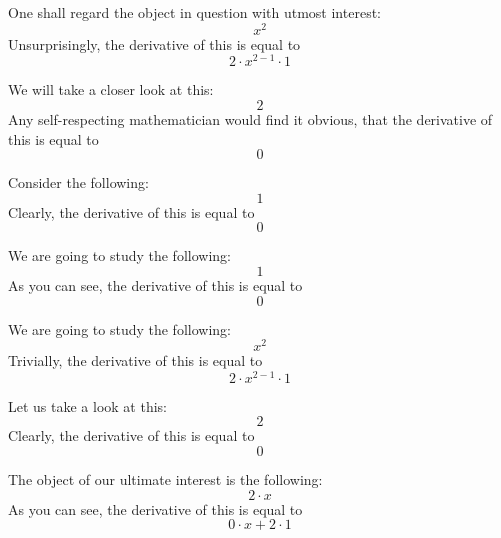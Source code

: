 \documentclass{article}
\begin{document}
One shall regard the object in question with utmost interest:
\begin{equation}
x ^{2 } 
\end{equation}
Unsurprisingly, the derivative of this is equal to
\begin{equation}
2 \cdot x ^{2 - 1 } \cdot 1 
\end{equation}

We will take a closer look at this:
\begin{equation}
2 
\end{equation}
Any self-respecting mathematician would find it obvious, that the derivative of this is equal to
\begin{equation}
0 
\end{equation}

Consider the following:
\begin{equation}
1 
\end{equation}
Clearly, the derivative of this is equal to
\begin{equation}
0 
\end{equation}

We are going to study the following:
\begin{equation}
1 
\end{equation}
As you can see, the derivative of this is equal to
\begin{equation}
0 
\end{equation}

We are going to study the following:
\begin{equation}
x ^{2 } 
\end{equation}
Trivially, the derivative of this is equal to
\begin{equation}
2 \cdot x ^{2 - 1 } \cdot 1 
\end{equation}

Let us take a look at this:
\begin{equation}
2 
\end{equation}
Clearly, the derivative of this is equal to
\begin{equation}
0 
\end{equation}

The object of our ultimate interest is the following:
\begin{equation}
2 \cdot x 
\end{equation}
As you can see, the derivative of this is equal to
\begin{equation}
0 \cdot x + 2 \cdot 1 
\end{equation}
\end{document}

